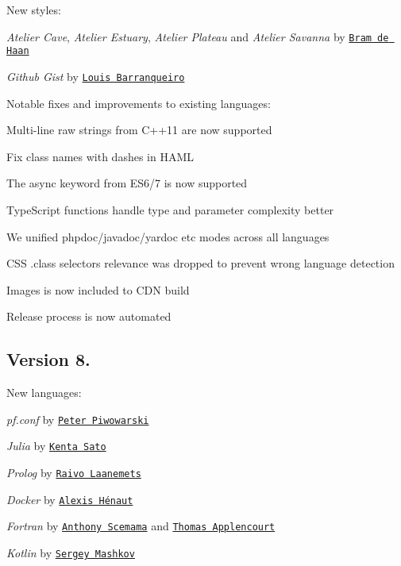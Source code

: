 New styles\+:


\begin{DoxyItemize}
\item {\itshape Atelier Cave}, {\itshape Atelier Estuary}, {\itshape Atelier Plateau} and {\itshape Atelier Savanna} by \href{https://github.com/atelierbram}{\tt Bram de Haan}
\item {\itshape Github Gist} by \href{https://github.com/LouisBarranqueiro}{\tt Louis Barranqueiro}
\end{DoxyItemize}

Notable fixes and improvements to existing languages\+:


\begin{DoxyItemize}
\item Multi-\/line raw strings from C++11 are now supported
\item Fix class names with dashes in H\+A\+ML
\item The {\ttfamily async} keyword from E\+S6/7 is now supported
\item Type\+Script functions handle type and parameter complexity better
\item We unified phpdoc/javadoc/yardoc etc modes across all languages
\item C\+SS .class selectors relevance was dropped to prevent wrong language detection
\item Images is now included to C\+DN build
\item Release process is now automated
\end{DoxyItemize}

\subsection*{Version 8.}

New languages\+:


\begin{DoxyItemize}
\item {\itshape pf.\+conf} by \href{https://github.com/oldlaptop}{\tt Peter Piwowarski}
\item {\itshape Julia} by \href{https://github.com/bicycle1885}{\tt Kenta Sato}
\item {\itshape Prolog} by \href{https://github.com/rla}{\tt Raivo Laanemets}
\item {\itshape Docker} by \href{https://github.com/AlexisNo}{\tt Alexis Hénaut}
\item {\itshape Fortran} by \href{https://github.com/scemama}{\tt Anthony Scemama} and \href{https://github.com/TApplencourt}{\tt Thomas Applencourt}
\item {\itshape Kotlin} by \href{https://github.com/cy6erGn0m}{\tt Sergey Mashkov}
\end{DoxyItemize}

